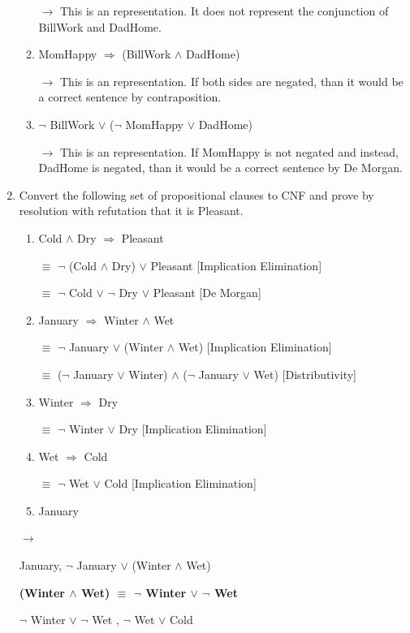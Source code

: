 \documentclass[10pt]{article}
\begin{document}
\begin{enumerate}
\begin{enumerate}
  $\rightarrow$ This is an  representation. It does not represent the conjunction of BillWork and DadHome.
  \item MomHappy $\Rightarrow$ (BillWork $\wedge$ DadHome) \par
  $\rightarrow$ This is an  representation. If both sides are negated, than it would be a correct sentence by contraposition. 
  \item $\neg$ BillWork $\vee$ ($\neg$ MomHappy $\vee$ DadHome) \par
  $\rightarrow$ This is an  representation. If MomHappy is not negated and instead, DadHome is negated, than it would be a correct sentence by De Morgan.
  \end{enumerate}

\item  Convert the following set of propositional clauses to CNF and prove by resolution with refutation that it is Pleasant.
  \begin{enumerate}
  \item Cold $\wedge$ Dry $\Rightarrow$ Pleasant \par
  $\equiv$ $\neg$ (Cold $\wedge$ Dry) $\vee$ Pleasant [Implication Elimination] \par
  $\equiv$ $\neg$ Cold $\vee$ $\neg$ Dry $\vee$ Pleasant [De Morgan]
  \item January $\Rightarrow$ Winter $\wedge$ Wet \par
  $\equiv$ $\neg$ January $\vee$ (Winter $\wedge$ Wet) [Implication Elimination] \par
  $\equiv$ ($\neg$ January $\vee$ Winter) $\wedge$ ($\neg$ January $\vee$ Wet) [Distributivity]
  \item Winter $\Rightarrow$ Dry \par
  $\equiv$ $\neg$ Winter $\vee$ Dry [Implication Elimination]
  \item Wet $\Rightarrow$ Cold \par
  $\equiv$ $\neg$ Wet $\vee$ Cold [Implication Elimination]
  \item January
  \end{enumerate}
  $\rightarrow$ \par
  \begin{center}
  January, $\neg$ January $\vee$ (Winter $\wedge$ Wet) \par 
  \hrulefill
  
  \textbf{(Winter $\wedge$ Wet) $\equiv$ $\neg$ Winter $\vee$ $\neg$ Wet} \par
  $\neg$ Winter $\vee$ $\neg$ Wet , $\neg$ Wet $\vee$ Cold \par
  \hrulefill
  

\end{center}
\end{enumerate}
\end{document}
